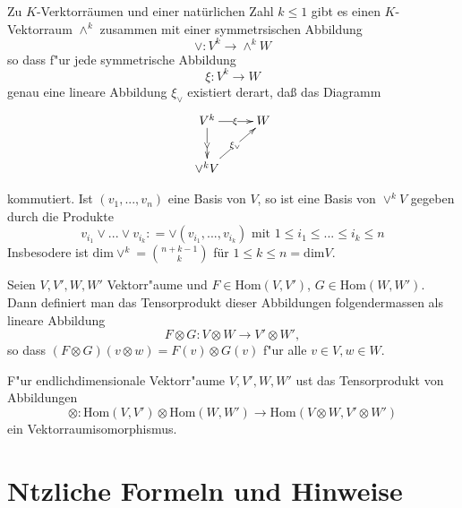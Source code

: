 \documentclass[11pt, a4paper]{article}
\begin{document}
\begin{theorem}
Zu $K$-Verktorräumen und einer natürlichen Zahl $k \leq 1$ gibt es einen $K$-Vektorraum
$\wedge^k$  zusammen mit einer symmetrsischen Abbildung 
$$
\vee: V^k \rightarrow \wedge ^k W
$$
so dass f"ur jede symmetrische Abbildung 
$$
\xi: V^k \rightarrow W
$$
genau eine lineare Abbildung $\xi_{\vee}$ existiert derart, daß das Diagramm 
\begin{gather*}
\xymatrix{V^k   \ar[d]|{\vee} \ar[r]|{\xi} & W\\
\vee^k V \ar[ur]|{\xi_\vee} & }
\end{gather*}

kommutiert. Ist $(v_1,...,v_n)$ eine Basis von $V$, so ist eine Basis von $\vee^k V$ gegeben durch die Produkte 
$$
v_{i_1} \vee ... \vee v_{i_k} : =  \vee (v_{i_1}, ..., v_{i_k}) \text{ mit } 1 \leq i_1 \leq ... \leq  i_k \leq n
$$
Insbesodere ist $\mathrm{dim}\vee^k = \binom{n+k-1}{k}$ für $ 1 \leq k \leq n = \mathrm{dim}V$. 
\end{theorem}


\begin{definition}
Seien $V, V', W, W'$ Vektorr"aume und $F \in \mathrm{Hom}(V, V')$, $G \in \mathrm{Hom}(W, W')$. Dann definiert man das Tensorprodukt dieser Abbildungen folgendermassen als lineare Abbildung
$$
F \otimes G: V \otimes W \rightarrow V' \otimes W',
$$
so dass $(F \otimes G)(v \otimes w) = F(v) \otimes G(v)$ f"ur alle $v\in V, w \in W$.
\end{definition}

\begin{theorem}
F"ur endlichdimensionale Vektorr"aume $V, V', W, W'$ ust das Tensorprodukt von Abbildungen 
$$
\otimes: \mathrm{Hom}(V, V') \otimes  \mathrm{Hom}(W, W') \rightarrow \mathrm{Hom}(V \otimes W, V' \otimes W')
$$
ein Vektorraumisomorphismus.
\end{theorem}


 
\section{N\uee tzliche Formeln und Hinweise}
\end{document}
